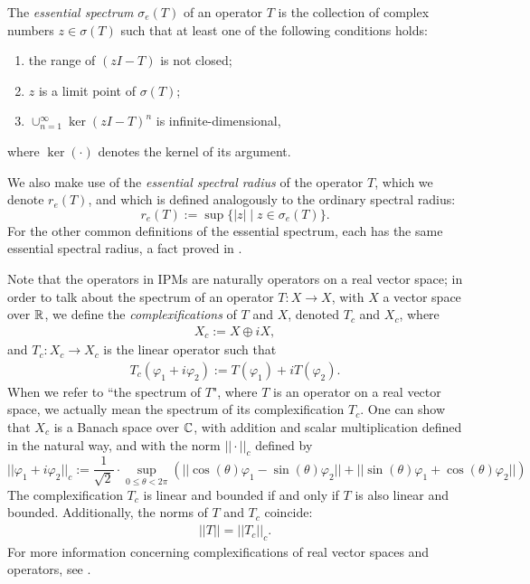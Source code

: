 \begin{definition}
	The \emph{essential spectrum} $\sigma_e(T)$ of an operator $T$ is the collection of complex numbers $z \in \sigma(T)$ such that at least one of the following conditions holds:
	\begin{enumerate}
		\item the range of $(z I - T)$ is not closed;
		\item $z$ is a limit point of $\sigma(T)$;
		\item $\cup_{n=1}^\infty \ker (z I- T)^n$ is infinite-dimensional,
	\end{enumerate}
	where $\ker(\cdot)$ denotes the kernel of its argument.
\end{definition}

We also make use of the \emph{essential spectral radius} of the operator $T$, which we denote $r_e(T)$, and which is defined analogously to the ordinary spectral radius:
\[r_e(T) := \sup \{ |z| \mid z \in \sigma_e(T)\}.\]
For the other common definitions of the essential spectrum, each has the same essential spectral radius, a fact proved in \cite{Edmunds1987}.

Note that the operators in IPMs are naturally operators on a real vector space; in order to talk about the spectrum of an operator $T:X \to X$, with $X$ a vector space over $\mathbb{R}$, we define the \emph{complexifications} of $T$ and $X$, denoted $T_c$ and $X_c$, where
\begin{align}
	X_c := X \oplus i X \label{eqn:complexifyxpace},
\end{align}
and $T_c: X_c \to X_c$ is the linear operator such that
\begin{align}
	T_c(\varphi_1 + i \varphi_2) := T(\varphi_1) + i T(\varphi_2). \label{eqn:complexifyT}
\end{align}
When we refer to ``the spectrum of $T$", where $T$ is an operator on a real vector space, we actually mean the spectrum of its complexification $T_c$. One can show that $X_c$ is a Banach space over $\mathbb{C}$, with addition and scalar multiplication defined in the natural way, and with the norm $|| \cdot ||_c$ defined by
\[||\varphi_1 + i \varphi_2||_c := \frac{1}{\sqrt 2} \cdot \sup_{0 \leq \theta < 2\pi} (||\cos( \theta ) \varphi_1 - \sin( \theta ) \varphi_2|| + ||\sin( \theta ) \varphi_1 + \cos( \theta ) \varphi_2 ||)\]
The complexification $T_c$ is linear and bounded if and only if $T$ is also linear and bounded. Additionally, the norms of $T$ and $T_c$ coincide:
\begin{align}
	||T|| = ||T_c||_c. \label{eqn:equalnorms}
\end{align}
For more information concerning complexifications of real vector spaces and operators, see \cite{Edmunds1972}. 

